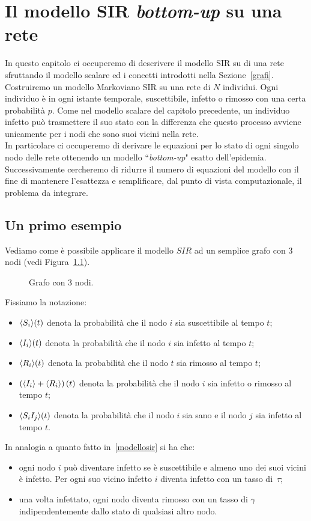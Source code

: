 \chapter{Il modello SIR \textit{bottom-up} su una rete}
In questo capitolo ci occuperemo di descrivere il modello SIR su di una rete sfruttando il modello scalare ed i concetti introdotti nella Sezione~\ref{grafi}. Costruiremo un modello Markoviano SIR su una rete di $N$ individui. Ogni individuo \`e in ogni istante temporale, suscettibile, infetto o rimosso con una certa probabilit\`a $p$. Come nel modello scalare del capitolo precedente, un individuo infetto pu\`o trasmettere il suo stato con la differenza che questo processo avviene unicamente per i nodi che sono suoi vicini nella rete.\\
In particolare ci occuperemo di derivare le equazioni per lo stato di ogni singolo nodo delle rete ottenendo un modello ``\textit{bottom-up}" esatto dell'epidemia. Successivamente cercheremo di ridurre il numero di equazioni del modello con il fine di mantenere l'esattezza e semplificare, dal punto di vista computazionale, il problema da integrare.  \section{Un primo esempio}
Vediamo come \`e possibile applicare il modello $SIR$ ad un semplice grafo con 3 nodi (vedi Figura~\ref{fig::3nodi}).\\
\begin{figure}[ht]
\centering
{}	
\caption{Grafo con 3 nodi.}
\label{fig::3nodi}
\end{figure}

Fissiamo la notazione:
\begin{itemize}
	\item  $\langle S_i \rangle(t)$  denota la probabilit\`a che il nodo $i$ sia suscettibile al tempo $t$;
	\item   $\langle I_i \rangle(t)$  denota la probabilit\`a che il nodo $i$ sia infetto al tempo $t$;
	\item  $\langle R_i \rangle(t)$  denota la probabilit\`a che il nodo $t$ sia rimosso al tempo $t$;
	\item $\left(  \langle  I_i \rangle+ \langle  R_i \rangle \right)(t)$ denota la probabilit\`a che il nodo $i$ sia infetto o rimosso al tempo $t$;
	\item $\langle S_iI_j \rangle(t)$ denota la probabilit\`a che il nodo $i$ sia sano e il nodo $j$ sia infetto al tempo $t$.
	\end{itemize}
In analogia a quanto fatto in~\ref{modellosir} si ha che:
\begin{itemize}
	\item ogni nodo $i$ pu\`o diventare infetto se \`e suscettibile e almeno uno dei suoi vicini \`e infetto. Per ogni suo vicino infetto $i$ diventa infetto con un tasso di~$\tau$;
	\item una volta infettato, ogni nodo diventa rimosso con un tasso di $\gamma$ indipendentemente dallo stato di qualsiasi altro nodo.
\end{itemize}

